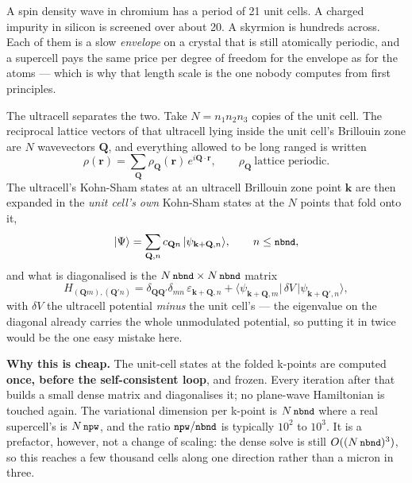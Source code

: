 \documentclass[11pt,a4paper]{article}
\newcommand{\code}[1]{\texttt{\small #1}}
\begin{document}
A spin density wave in chromium has a period of 21 unit cells. A charged
impurity in silicon is screened over about 20. A skyrmion is hundreds across.
Each of them is a slow \emph{envelope} on a crystal that is still atomically
periodic, and a supercell pays the same price per degree of freedom for the
envelope as for the atoms --- which is why that length scale is the one nobody
computes from first principles.

The ultracell separates the two. Take $N = n_1n_2n_3$ copies of the unit cell.
The reciprocal lattice vectors of that ultracell lying inside the unit cell's
Brillouin zone are $N$ wavevectors $\mathbf Q$, and everything allowed to be
long ranged is written
\begin{equation*}
\rho(\mathbf r) = \sum_{\mathbf Q} \rho_{\mathbf Q}(\mathbf r)\,
   e^{i\mathbf Q\cdot\mathbf r},
\qquad \rho_{\mathbf Q}\ \text{lattice periodic}.
\end{equation*}
The ultracell's Kohn-Sham states at an ultracell Brillouin zone point
$\mathbf k$ are then expanded in the \emph{unit cell's own} Kohn-Sham states at
the $N$ points that fold onto it,
\begin{equation*}
|\Psi\rangle = \sum_{\mathbf Q, n} c_{\mathbf Q n}\,
  |\psi_{\mathbf k + \mathbf Q, n}\rangle, \qquad n \le \code{nbnd},
\end{equation*}
and what is diagonalised is the $N\,\code{nbnd} \times N\,\code{nbnd}$ matrix
\begin{equation*}
H_{(\mathbf Q m),(\mathbf Q' n)} =
  \delta_{\mathbf Q \mathbf Q'}\delta_{mn}\,\varepsilon_{\mathbf k+\mathbf Q,n}
  + \langle \psi_{\mathbf k+\mathbf Q, m}|\,\delta V\,
    |\psi_{\mathbf k+\mathbf Q', n}\rangle ,
\end{equation*}
with $\delta V$ the ultracell potential \emph{minus} the unit cell's --- the
eigenvalue on the diagonal already carries the whole unmodulated potential, so
putting it in twice would be the one easy mistake here.

\textbf{Why this is cheap.} The unit-cell states at the folded k-points are
computed \textbf{once, before the self-consistent loop}, and frozen. Every
iteration after that builds a small dense matrix and diagonalises it; no
plane-wave Hamiltonian is touched again. The variational dimension per k-point
is $N\,\code{nbnd}$ where a real supercell's is $N\,\code{npw}$, and the ratio
$\code{npw}/\code{nbnd}$ is typically $10^2$ to $10^3$. It is a prefactor,
however, not a change of scaling: the dense solve is still
$O((N\,\code{nbnd})^3)$, so this reaches a few thousand cells along one
direction rather than a micron in three.
\end{document}

